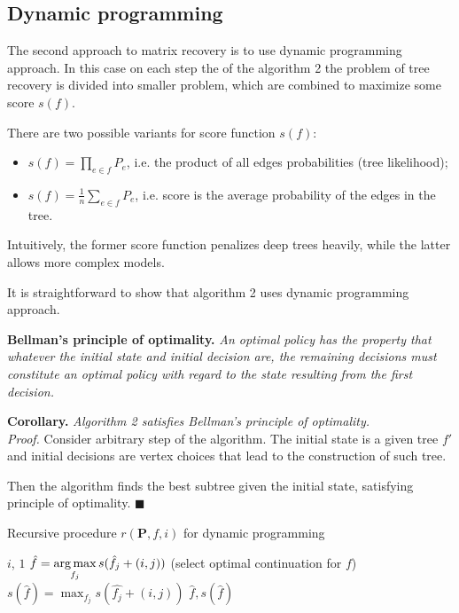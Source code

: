 \documentclass[12pt]{article}
\begin{document}
\subsection{Dynamic programming}
The second approach to matrix recovery is to use dynamic programming approach.
In this case on each step the of the algorithm 2 the problem of tree recovery is divided into smaller problem, which are combined to maximize some score $s(f)$.

There are two possible variants for score function $s(f)$:
\begin{itemize}
	\item $s(f) = \prod\limits_{e \in f} P_{e}$, i.e. the product of all edges probabilities (tree likelihood);
	\item $s(f) = \frac{1}{n}\sum\limits_{e \in f} P_{e}$, i.e. score is the average probability of the edges in the tree.
\end{itemize}
Intuitively, the former score function penalizes deep trees heavily, while the latter allows more complex models.

It is straightforward to show that algorithm 2 uses dynamic programming approach.

\textbf{Bellman's principle of optimality.} \textit{An optimal policy has the property that whatever the initial state and initial decision are, the remaining decisions must constitute an optimal policy with regard to the state resulting from the first decision.}

\textbf{Corollary.} \textit{Algorithm 2 satisfies Bellman's principle of optimality.}\\
\textit{Proof.} Consider arbitrary step of the algorithm. The initial state is a given tree $f'$ and initial decisions are vertex choices that lead to the construction of such tree.

Then the algorithm finds the best subtree given the initial state, satisfying principle of optimality. $\blacksquare$

\begin{algorithm}[!ht]
\caption{Recursive procedure $r(\mathbf{P}, f, i)$ for dynamic programming}
	 {\Return$i$, $1$}
	$\hat{f} = \mathop{\arg \max}\limits_{f_j} s(\hat{f_j} + (i, j))$ \enspace (select optimal continuation for $f$)\;
	$s(\hat{f}) = \max_{f_j} s(\hat{f_j} + (i, j))$\;
	\Return $\hat{f}, s(\hat{f})$
\end{algorithm}
\end{document}
